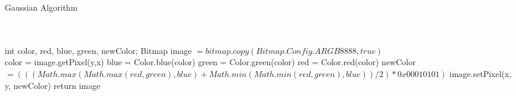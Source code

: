 \documentclass[11pt]{article}
\begin{document}
\begin{algorithm}
   \caption{Gaussian Algorithm}
    \begin{algorithmic}[1]
      \\
		\\
        \State int color, red, blue, green, newColor;
        \State  Bitmap image $= bitmap.copy(Bitmap.Config.ARGB8888, true)$
\\
            		\State color = image.getPixel(y,x)
            		\State blue = Color.blue(color)
            		\State green = Color.green(color)
            		\State red = Color.red(color)
            		\State newColor $= (((Math.max(Math.max(red, green), blue) + Math.min(Math.min(red, green),
                        blue))/2) *0x00010101)$
                \State image.setPixel(x, y, newColor)
        		\EndFor
        \EndFor
        \State return image
       \EndFunction

\end{algorithmic}
\end{algorithm}
\end{document}
